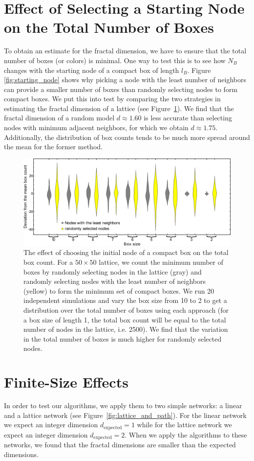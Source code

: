 \documentclass[9pt,onecolumn,twoside]{pnas-new}
\begin{document}
\section*{Effect of Selecting a Starting Node on the Total Number of Boxes}
To obtain an estimate for the fractal dimension, we have to ensure that the total number of boxes (or colors) is minimal. One way to test this is to see how $N_B$ changes with the starting node of a compact box of length $l_B$. Figure \ref{fig:starting_node} shows why picking a node with the least number of neighbors can provide a smaller number of boxes than randomly selecting nodes to form compact boxes. We put this into test by comparing the two strategies in estimating the fractal dimension of a lattice (see Figure~\ref{fig:comparing_startingNodes}). We find that the fractal dimension of a random model $d \approx 1.60$ is less accurate than selecting nodes with minimum adjacent neighbors, for which we obtain $d \approx 1.75$. Additionally, the distribution of box counts tends to be much more spread around the mean for the former method.

\begin{figure}
    \centering
    \includegraphics[width=0.75\columnwidth]{images/decent_comparison.pdf}
    \caption{The effect of choosing the initial node of a compact box on the total box count. For a $50 \times 50$ lattice, we count the minimum number of boxes by randomly selecting nodes in the lattice (gray) and randomly selecting nodes with the least number of neighbors (yellow) to form the minimum set of compact boxes. We run 20 independent simulations and vary the box size from 10 to 2 to get a distribution over the total number of boxes using each approach (for a box size of length 1, the total box count will be equal to the total number of nodes in the lattice, i.e. 2500). We find that the variation in the total number of boxes is much higher for randomly selected nodes.}
    \label{fig:comparing_startingNodes}
\end{figure}


\section*{Finite-Size Effects}
In order to test our algorithms, we apply them to two simple networks: a linear and a lattice network (see Figure~\ref{fig:lattice_and_path}). For the linear network we expect an integer dimension $d_\text{expected}=1$ while for the lattice network we expect an integer dimension $d_\text{expected}=2$. When we apply the algorithms to these networks, we found that the fractal dimensions are smaller than the expected dimensions.
\end{document}
